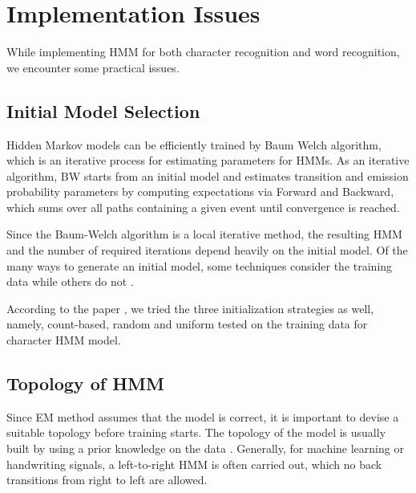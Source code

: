 
\section{Implementation Issues}

While implementing HMM for both character recognition and word recognition, we encounter some practical issues.

\subsection{Initial Model Selection}


Hidden Markov models can be efficiently trained by Baum Welch algorithm, which is an iterative process for estimating parameters for HMMs. As an iterative algorithm, BW starts from an initial model and estimates transition and emission probability parameters by computing expectations via Forward and Backward, which sums over all paths containing a given event until convergence is reached.

Since the Baum-Welch algorithm is a local iterative method, the resulting HMM and the number of required iterations depend heavily on the initial model. Of the many ways to generate an initial model, some techniques consider the training data while others do not \cite{Laan}.

According to the paper \cite{Laan}, we tried the three initialization strategies as well, namely, count-based, random and uniform tested on the training data for character HMM model.

\subsection{Topology of HMM}

Since EM method assumes that the model is correct, it is important to devise a suitable topology before training starts. The topology of the model is usually built by using a prior knowledge on the data \cite{Suen}. Generally, for machine learning or handwriting signals, a left-to-right HMM is often carried out, which no back transitions from right to left are allowed.

